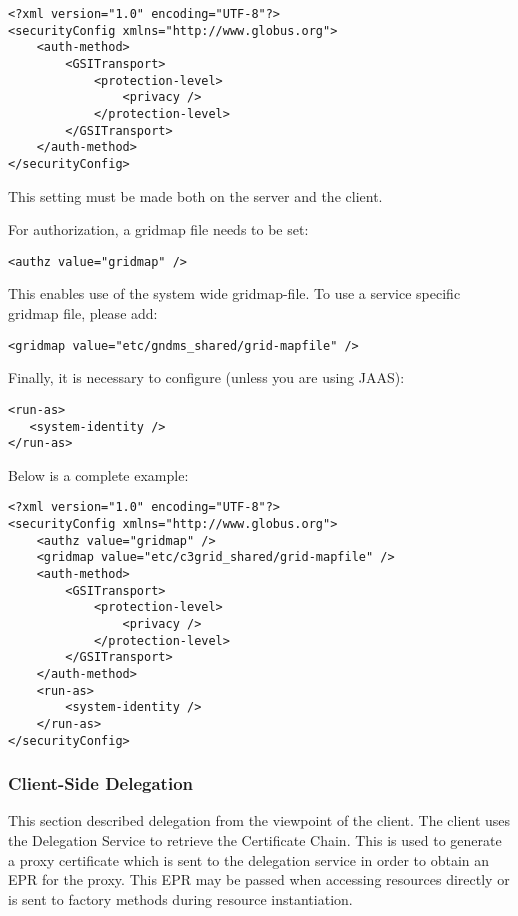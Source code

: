 \documentclass{article}
\begin{document}
\begin{verbatim}
<?xml version="1.0" encoding="UTF-8"?>
<securityConfig xmlns="http://www.globus.org">
    <auth-method>
        <GSITransport>
            <protection-level>
                <privacy />
            </protection-level>
        </GSITransport>
    </auth-method>
</securityConfig>
\end{verbatim}

This setting must be made both on the server and the client.

For authorization, a gridmap file needs to be set:


\begin{verbatim}
<authz value="gridmap" />
\end{verbatim}

This enables use of the system wide gridmap-file. To use a service
specific gridmap file, please add:


\begin{verbatim}
<gridmap value="etc/gndms_shared/grid-mapfile" />
\end{verbatim}

Finally, it is necessary to configure (unless you are using JAAS):

\begin{verbatim}
<run-as>
   <system-identity />
</run-as>
\end{verbatim}

Below is a complete example:

\begin{verbatim}
<?xml version="1.0" encoding="UTF-8"?>
<securityConfig xmlns="http://www.globus.org">
    <authz value="gridmap" />
    <gridmap value="etc/c3grid_shared/grid-mapfile" />
    <auth-method>
        <GSITransport>
            <protection-level>
                <privacy />
            </protection-level>
        </GSITransport>
    </auth-method>
    <run-as>
        <system-identity />
    </run-as>
</securityConfig>      
\end{verbatim}

\subsubsection{Client-Side Delegation}

This section described delegation from the viewpoint of the client.
The client uses the Delegation Service to retrieve the Certificate
Chain. This is used to generate a proxy certificate which is sent
to the delegation service in order to obtain an EPR for the proxy.
This EPR may be passed when accessing resources directly or is sent
to factory methods during resource instantiation.
\end{document}
